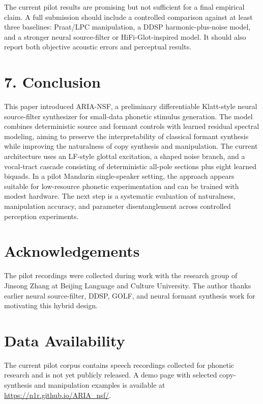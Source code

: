 \documentclass[
  10pt,
]{article}
\begin{document}
The current pilot results are promising but not sufficient for a final
empirical claim. A full submission should include a controlled
comparison against at least three baselines: Praat/LPC manipulation, a
DDSP harmonic-plus-noise model, and a stronger neural source-filter or
HiFi-Glot-inspired model. It should also report both objective acoustic
errors and perceptual results.

\section{7. Conclusion}\label{conclusion}

This paper introduced ARIA-NSF, a preliminary differentiable Klatt-style
neural source-filter synthesizer for small-data phonetic stimulus
generation. The model combines deterministic source and formant controls
with learned residual spectral modeling, aiming to preserve the
interpretability of classical formant synthesis while improving the
naturalness of copy synthesis and manipulation. The current architecture
uses an LF-style glottal excitation, a shaped noise branch, and a
vocal-tract cascade consisting of deterministic all-pole sections plus
eight learned biquads. In a pilot Mandarin single-speaker setting, the
approach appears suitable for low-resource phonetic experimentation and
can be trained with modest hardware. The next step is a systematic
evaluation of naturalness, manipulation accuracy, and parameter
disentanglement across controlled perception experiments.

\section{Acknowledgements}\label{acknowledgements}

The pilot recordings were collected during work with the research group
of Jinsong Zhang at Beijing Language and Culture University. The author
thanks earlier neural source-filter, DDSP, GOLF, and neural formant
synthesis work for motivating this hybrid design.

\section{Data Availability}\label{data-availability}

The current pilot corpus contains speech recordings collected for
phonetic research and is not yet publicly released. A demo page with
selected copy-synthesis and manipulation examples is available at
\url{https://n1r.github.io/ARIA_nsf/}.
\end{document}
